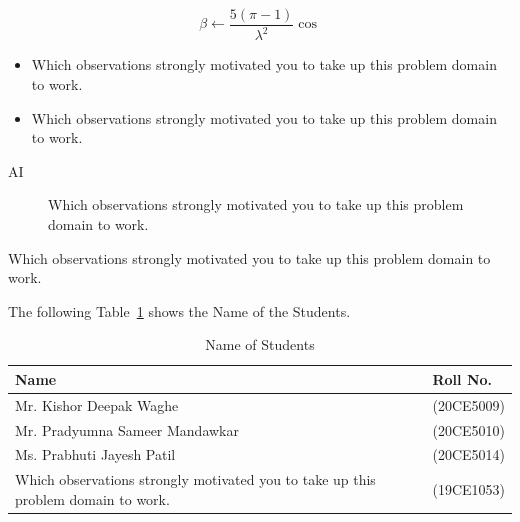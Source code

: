 \begin{equation} \label{eq1}
	\beta \leftarrow \frac{5 (\pi - 1)}{\lambda^2}\cos
\end{equation}




\cite{kunjir2017data}






\begin{itemize}
	\item Which observations strongly motivated you to take up this problem domain to work.
	
	\item Which observations strongly motivated you to take up this problem domain to work.
\end{itemize}

\begin{description}
	\item[AI] Which observations strongly motivated you to take up this problem domain to work.
\end{description}

\begin{flushleft}	
	Which observations strongly motivated you to take up this problem domain to work.
\end{flushleft}


The following Table~\ref{tab1} shows the Name of the Students.
\begin{table}[!ht] \label{tab1}
	\caption{Name of Students}
	\centering
	\begin{tabular}{|p{5cm}|p{5cm}|}
		\hline
		\textbf{Name}                  & \textbf{Roll No.} \\ \hline
		Mr. Kishor Deepak Waghe        & (20CE5009)        \\ \hline
		Mr. Pradyumna Sameer Mandawkar & (20CE5010)        \\ \hline
		Ms. Prabhuti Jayesh Patil      & (20CE5014)        \\ \hline
		Which observations strongly motivated you to take up this problem domain to work.      & (19CE1053)        \\ \hline
	\end{tabular}
\end{table}









